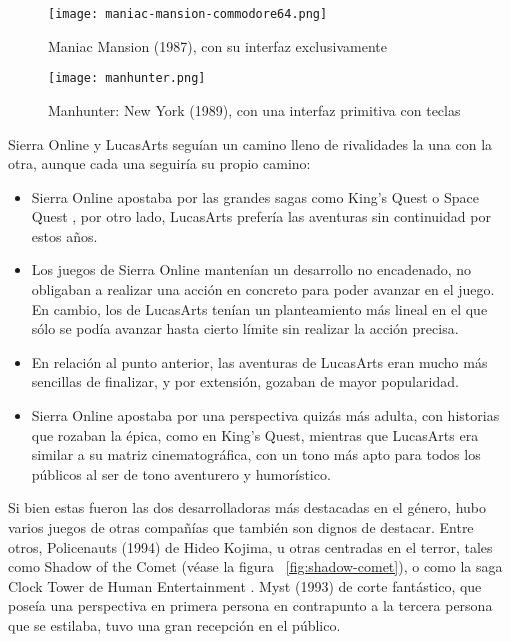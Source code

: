 \begin{figure}[H] 
  \begin{center}
    \texttt{[image: maniac-mansion-commodore64.png]}
  \end{center}
  \caption{Maniac Mansion (1987), con su interfaz exclusivamente }
    \label{fig:maniac-mansion}
\end{figure}

\begin{figure}[H] 
  \begin{center}
    \texttt{[image: manhunter.png]}
  \end{center}
  \caption{Manhunter: New York (1989), con una interfaz  primitiva con teclas}
    \label{fig:manhunter}
\end{figure}

Sierra Online y LucasArts seguían un camino lleno de rivalidades la una con la otra, aunque cada una seguiría su propio camino:
\begin{itemize} 
\item Sierra Online apostaba por las grandes sagas como King's Quest  o Space Quest , por otro  lado, LucasArts prefería las aventuras sin continuidad por estos años.

\item Los juegos de Sierra Online mantenían un desarrollo no encadenado, no obligaban a realizar una acción en concreto para poder avanzar en el juego. En cambio, los de LucasArts tenían un planteamiento más lineal en el que sólo se podía avanzar hasta cierto límite sin realizar la acción precisa.

\item En relación al punto anterior, las aventuras de LucasArts eran mucho más sencillas de finalizar, y por extensión, gozaban de mayor popularidad.

\item Sierra Online apostaba por una perspectiva quizás más adulta, con historias que rozaban la épica, como en King's Quest, mientras que LucasArts era similar a su matriz cinematográfica, con un tono más apto para todos los públicos al ser de tono aventurero y humorístico.
\end{itemize}

Si bien estas fueron las dos desarrolladoras más destacadas en el género, hubo varios juegos de otras compañías que también son dignos de destacar. Entre otros, Policenauts  (1994) de Hideo Kojima, u otras centradas en el terror, tales como Shadow of the Comet  (véase la figura ~\ref{fig:shadow-comet}), o como la saga Clock Tower  de Human Entertainment . Myst  (1993) de corte fantástico, que poseía una perspectiva en primera persona en contrapunto a la tercera persona que se estilaba, tuvo una gran recepción en el público. 

